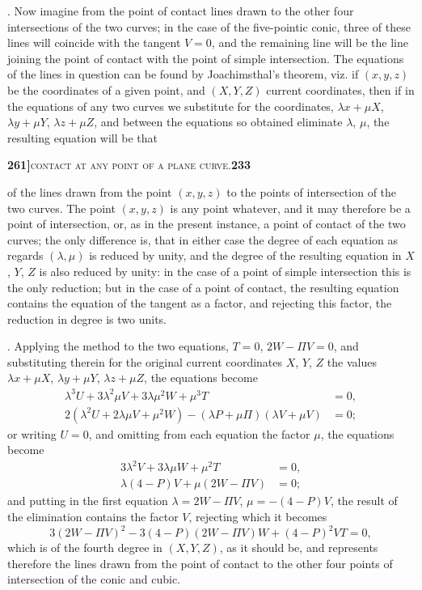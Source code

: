 \documentclass[11pt]{article}
\begin{document}
\medskip

. Now imagine from the point of contact lines drawn to the other four intersections of the two curves; in the case of the five-pointic conic, three of these lines will coincide with the tangent $V = 0$, and the remaining line will be the line joining the point of contact with the point of simple intersection. The equations of the lines in question can be found by Joachimsthal's theorem, viz. if $(x, y, z)$ be the coordinates of a given point, and $(X, Y, Z)$ current coordinates, then if in the equations of any two curves we substitute for the coordinates, $\lambda x + \mu X$, $\lambda y + \mu Y$, $\lambda z + \mu Z$, and between the equations so obtained eliminate $\lambda$, $\mu$, the resulting equation will be that

\newpage
\noindent\textbf{261]}\hfill\textsc{contact at any point of a plane curve.}\hfill\textbf{233}

\medskip

\noindent of the lines drawn from the point $(x, y, z)$ to the points of intersection of the two curves. The point $(x, y, z)$ is any point whatever, and it may therefore be a point of intersection, or, as in the present instance, a point of contact of the two curves; the only difference is, that in either case the degree of each equation as regards $(\lambda, \mu)$ is reduced by unity, and the degree of the resulting equation in $X$, $Y$, $Z$ is also reduced by unity: in the case of a point of simple intersection this is the only reduction; but in the case of a point of contact, the resulting equation contains the equation of the tangent as a factor, and rejecting this factor, the reduction in degree is two units.

\medskip

. Applying the method to the two equations, $T = 0$, $2W - \Pi V = 0$, and substituting therein for the original current coordinates $X$, $Y$, $Z$ the values $\lambda x + \mu X$, $\lambda y + \mu Y$, $\lambda z + \mu Z$, the equations become
\[
\begin{aligned}
  \lambda^3 U + 3\lambda^2 \mu V + 3\lambda \mu^2 W + \mu^3 T &= 0,\\
  2(\lambda^2 U + 2\lambda \mu V + \mu^2 W) - (\lambda P + \mu \Pi)(\lambda V + \mu V) &= 0;
\end{aligned}
\]
or writing $U = 0$, and omitting from each equation the factor $\mu$, the equations become
\[
\begin{aligned}
  3\lambda^2 V + 3\lambda \mu W + \mu^2 T &= 0,\\
  \lambda(4 - P) V + \mu(2W - \Pi V) &= 0;
\end{aligned}
\]
and putting in the first equation $\lambda = 2W - \Pi V$, $\mu = -(4 - P) V$, the result of the elimination contains the factor $V$, rejecting which it becomes
\[
  3(2W - \Pi V)^2 - 3(4 - P)(2W - \Pi V) W + (4 - P)^2 V T = 0,
\]
which is of the fourth degree in $(X, Y, Z)$, as it should be, and represents therefore the lines drawn from the point of contact to the other four points of intersection of the conic and cubic.
\end{document}
